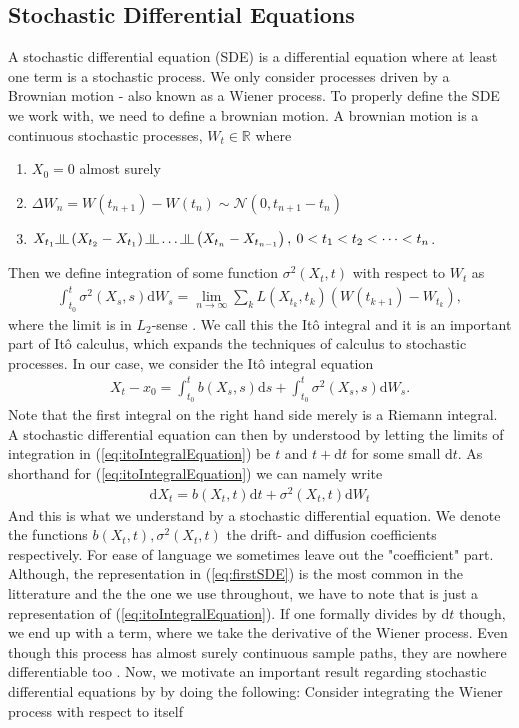 \subsection{Stochastic Differential Equations}
A stochastic differential equation (SDE) is a differential equation where at least one term is a stochastic process. We only consider processes driven by a Brownian motion - also known as a Wiener process. To properly define the SDE we work with, we need to define a brownian motion. A brownian motion is a continuous stochastic processes, $W_t\in\mathbb{R}$ where
\begin{enumerate}
    \item $X_0 = 0$ almost surely
    \item $\Delta W_n = W\left(t_{n + 1}\right) - W\left(t_{n}\right)\sim\mathcal{N}\left(0, t_{n + 1} - t_{n}\right)$
    \item $X_{t_1}\indep \left(X_{t_2} - X_{t_1}\right)\indep \dots \indep \left(X_{t_n} - X_{t_{n - 1}}\right), \: 0 < t_1 < t_2 < \dots < t_n$.
\end{enumerate}
Then we define integration of some function $\sigma^2(X_t, t)$ with respect to $W_t$ as
\begin{align}
    \int_{t_0}^t \sigma^2(X_s, s) \mathrm{d}W_s = \lim_{n \to \infty}\sum_k L\left(X_{t_k}, t_k\right)\left(W(t_{k + 1}) - W_{t_k}\right),
\end{align}
where the limit is in $L_2$-sense \cite[equation 4.6]{Srkk2019}. We call this the Itô integral and it is an important part of Itô calculus, which expands the techniques of calculus to stochastic processes. In our case, we consider the Itô integral equation
\begin{align}
    X_t - x_0 = \int_{t_0}^t b(X_s, s)\mathrm{d}s + \int_{t_0}^t \sigma^2(X_s, s)\mathrm{d}W_s. \label{eq:itoIntegralEquation}
\end{align}
Note that the first integral on the right hand side merely is a Riemann integral. A stochastic differential equation can then by understood by letting the limits of integration in (\ref{eq:itoIntegralEquation}) be $t$ and $t+\mathrm{d}t$ for some small $\mathrm{d}t$. As shorthand for (\ref{eq:itoIntegralEquation}) we can namely write
\begin{align}
    \mathrm{d}X_t = b(X_t, t)\mathrm{d}t + \sigma^2(X_t, t)\mathrm{d}W_t \label{eq:firstSDE}
\end{align}
And this is what we understand by a stochastic differential equation. We denote the functions $b(X_t, t), \sigma^2(X_t, t)$ the drift- and diffusion coefficients respectively. For ease of language we sometimes leave out the "coefficient" part. Although, the representation in (\ref{eq:firstSDE}) is the most common in the litterature and the the one we use throughout, we have to note that is just a representation of (\ref{eq:itoIntegralEquation}). If one formally divides by $\mathrm{d}t$ though, we end up with a term, where we take the derivative of the Wiener process. Even though this process has almost surely continuous sample paths, they are nowhere differentiable too \cite[theorem 11.22 and theorem 11.35]{Hansen2022}. Now, we motivate an important result regarding stochastic differential equations by by doing the following: Consider integrating the Wiener process with respect to itself
